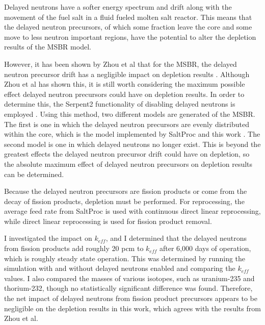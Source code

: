 Delayed neutrons have a softer energy spectrum and drift along with the movement of the fuel salt in a fluid fueled molten salt reactor. This means that the delayed neutron precursors, of which some fraction leave the core and some move to less neutron important regions, have the potential to alter the depletion results of the MSBR model.

However, it has been shown by Zhou et al that for the MSBR, the delayed neutron precursor drift has a negligible impact on depletion results \cite{zhou_fuel_2018}. Although Zhou et al has shown this, it is still worth considering the maximum possible effect delayed neutron precursors could have on depletion results. In order to determine this, the Serpent2 functionality of disabling delayed neutrons is employed \cite{leppanen_serpent_2015}. Using this method, two different models are generated of the MSBR. The first is one in which the delayed neutron precursors are evenly distributed within the core, which is the model implemented by SaltProc and this work \cite{rykhlevskii_modeling_2019}. The second model is one in which delayed neutrons no longer exist. This is beyond the greatest effects the delayed neutron precursor drift could have on depletion, so the absolute maximum effect of delayed neutron precursors on depletion results can be determined.

Because the delayed neutron precursors are fission products or come from the decay of fission products, depletion must be performed. For reprocessing, the average feed rate from SaltProc is used with continuous direct linear reprocessing, while direct linear reprocessing is used for fission product removal.

I investigated the impact on $k_{eff}$, and I determined that the delayed neutrons from fission products add roughly 20 pcm to $k_{eff}$ after 6,000 days of operation, which is roughly steady state operation.
This was determined by running the simulation with and without delayed neutrons enabled and comparing the $k_{eff}$ values.
I also compared the masses of various isotopes, such as uranium-235 and thorium-232, though no statistically significant difference was found. Therefore, the net impact of delayed neutrons from fission product precursors appears to be negligible on the depletion results in this work, which agrees with the results from Zhou et al.


